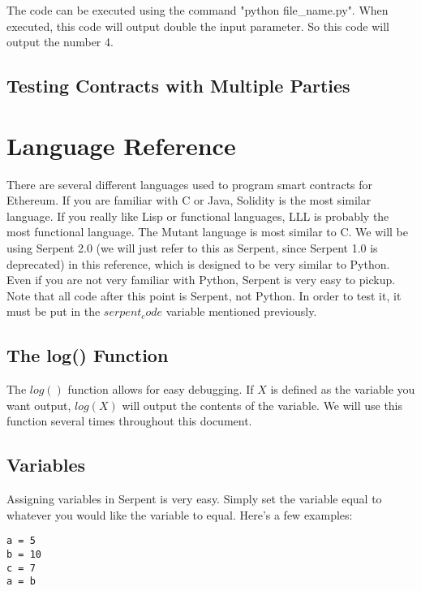 \documentclass[12pt]{article}
\begin{document}
The code can be executed using the command "python file\_name.py". When executed, this code will output double the input parameter. So this code will output the number 4. \cite{test_contracts.py,Using pyethereum.tester}

\subsection{Testing Contracts with Multiple Parties}

\section{Language Reference}

There are several different languages used to program smart contracts for Ethereum. If you are familiar with C or Java, Solidity is the most similar language. If you really like Lisp or functional languages, LLL is probably the most functional language. The Mutant language is most similar to C. We will be using Serpent 2.0 (we will just refer to this as Serpent, since Serpent 1.0 is deprecated) in this reference, which is designed to be very similar to Python. Even if you are not very familiar with Python, Serpent is very easy to pickup. Note that all code after this point is Serpent, not Python. In order to test it, it must be put in the $serpent_code$ variable mentioned previously.

\subsection{The log() Function}

The $log()$ function allows for easy debugging. If $X$ is defined as the variable you want output, $log(X)$ will output the contents of the variable. We will use this function several times throughout this document.


\subsection{Variables}

Assigning variables in Serpent is very easy. Simply set the variable equal to whatever you would like the variable to equal. Here's a few examples:

\begin{lstlisting}
a = 5
b = 10
c = 7
a = b
\end{lstlisting}
\end{document}
